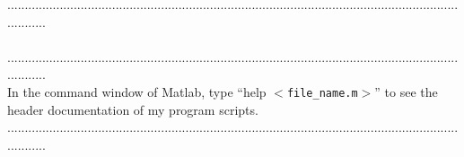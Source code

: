 \documentclass[a4paper,12pt]{article} %
\begin{document}
............................................................................................................................................\\\\

............................................................................................................................................\\
In the command window of Matlab, type ``help $<$\verb|file_name.m|$>$'' to see the header documentation of my program scripts.\\
............................................................................................................................................
\end{document}

